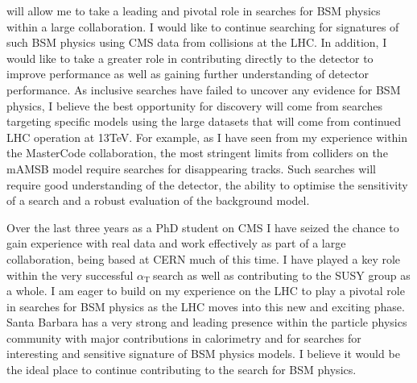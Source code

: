 \documentclass[11pt]{article}
\theoremstyle{plain} \numberwithin{equation}{section}
\theoremstyle{definition}
\DeclareRobustCommand{\alphat}{$\alpha_{\text{T}}~$}
\begin{document}
will allow me to take a leading and pivotal role in searches for BSM physics within a large collaboration.
I would like to continue searching for signatures of such BSM physics using CMS data from collisions at the LHC.
In addition, I would like to take a greater role in contributing directly to the detector to improve performance
as well as gaining further understanding of detector performance. As inclusive searches have failed 
to uncover any evidence for BSM physics, I believe the best opportunity for discovery will 
come from searches targeting specific models using the large datasets that will come
from continued LHC operation at 13TeV. For example, as I have seen from my experience within 
the MasterCode collaboration, the most stringent limits from colliders on the mAMSB 
model require searches for disappearing tracks. Such searches will require good understanding of the detector,
the ability to optimise the sensitivity of a search and a robust evaluation of the background model.

Over the last three years as a PhD student on CMS I have seized the chance to gain experience with real data
and work effectively as part of a large collaboration, being based at CERN much of this time. I have played 
a key role within the very successful \alphat search as well as contributing to the SUSY group as a whole.
I am eager to build on my experience on the LHC to play a pivotal role in searches for BSM physics as the LHC
moves into this new and exciting phase. Santa Barbara has a very strong and leading presence within the particle
physics community with major contributions in calorimetry and for searches for interesting and sensitive signature
of BSM physics models. I believe it would be the ideal place to continue contributing to the search for BSM physics.

\end{document}
